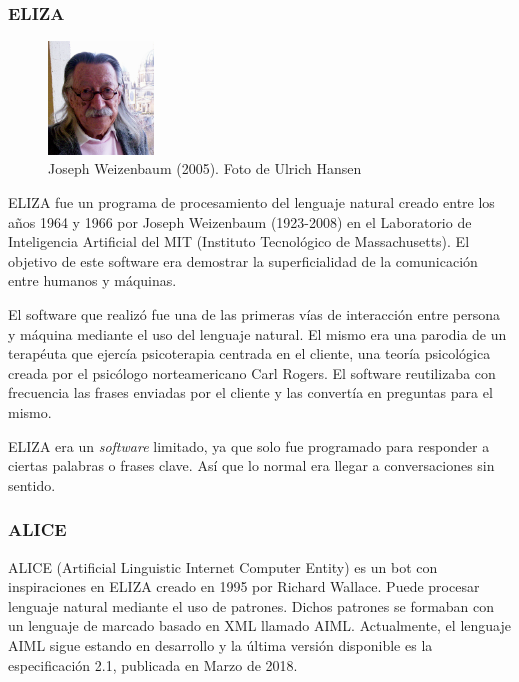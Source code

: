 \documentclass[spanish,12pt, a4paper, twoside]{paper}
\begin{document}
\subsubsection{ELIZA}

\begin{figure}
\centering
	\includegraphics[width=0.25\textwidth]{recursos/Weizenbaum}
\caption{Joseph Weizenbaum (2005). Foto de Ulrich Hansen}
\label{fig:Joseph Weizenbaum}
\end{figure}

ELIZA fue un programa de procesamiento del lenguaje natural creado entre los años 1964 y 1966 por Joseph Weizenbaum (1923-2008) en el Laboratorio de Inteligencia Artificial del MIT (Instituto Tecnológico de Massachusetts). El objetivo de este software era demostrar la superficialidad de la comunicación entre humanos y máquinas.
\newline

El software que realizó fue una de las primeras vías de interacción entre persona y máquina mediante el uso del lenguaje natural. El mismo era una parodia de un terapéuta que ejercía psicoterapia centrada en el cliente, una teoría psicológica creada por el psicólogo norteamericano Carl Rogers. El software reutilizaba con frecuencia las frases enviadas por el cliente y las convertía en preguntas para el mismo.
\newline

ELIZA era un \emph{software} limitado, ya que solo fue programado para responder a ciertas palabras o frases clave. Así que lo normal era llegar a conversaciones sin sentido.

\subsubsection{ALICE}
ALICE (Artificial Linguistic Internet Computer Entity) es un bot con inspiraciones en ELIZA creado en 1995 por Richard Wallace. Puede procesar lenguaje natural mediante el uso de patrones. Dichos patrones se formaban con un lenguaje de marcado basado en XML llamado AIML. Actualmente, el lenguaje AIML sigue estando en desarrollo y la última versión disponible es la especificación 2.1, publicada en Marzo de 2018. 
\newline
\end{document}
